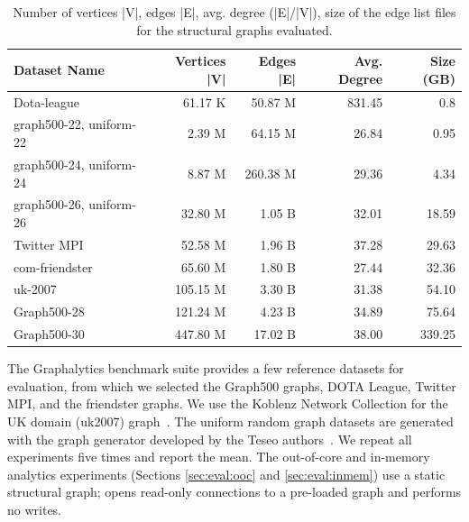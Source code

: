 \begin{table}[h!]
  \footnotesize
  \begin{tabular*}{\columnwidth}{@{\extracolsep{\fill}}lrrrr@{}}
  \toprule
  Dataset Name &
    Vertices |V| &
    Edges |E| &
    Avg. Degree &
    Size (GB) \\ \midrule
  Dota-league             & 61.17 K  & 50.87 M  & 831.45 & 0.8    \\
  graph500-22, uniform-22 & 2.39 M   & 64.15 M  & 26.84  & 0.95   \\
  graph500-24, uniform-24 & 8.87 M   & 260.38 M & 29.36  & 4.34   \\
  graph500-26, uniform-26 & 32.80 M  & 1.05 B   & 32.01  & 18.59  \\
  Twitter MPI             & 52.58 M  & 1.96 B   & 37.28  & 29.63  \\
  com-friendster          & 65.60 M  & 1.80 B   & 27.44  & 32.36  \\
  uk-2007                 & 105.15 M & 3.30 B   & 31.38  & 54.10  \\
  Graph500-28             & 121.24 M & 4.23 B   & 34.89  & 75.64  \\
  Graph500-30             & 447.80 M & 17.02 B  & 38.00  & 339.25 \\ \bottomrule
  \end{tabular*}
  \caption{Number of vertices |V|, edges |E|, avg. degree (|E|/|V|), size of the edge list
  files for the structural graphs evaluated.}
  \label{tab:datasets}
  \end{table}
The Graphalytics benchmark suite provides a few reference datasets for evaluation, from which we selected the Graph500 graphs, DOTA League, Twitter MPI, and the friendster graphs.
We use the Koblenz Network Collection for the UK domain (uk2007) graph~\cite{kunegis2013konect}.
The uniform random graph datasets are generated with the graph generator developed by the Teseo authors~\cite{teseo2021deLeo}.
We repeat all experiments five times and report the mean.
The out-of-core and in-memory analytics experiments (Sections \ref{sec:eval:ooc} and \ref{sec:eval:inmem}) use a static structural graph; \project{} opens read-only connections to a pre-loaded graph and performs no writes.



